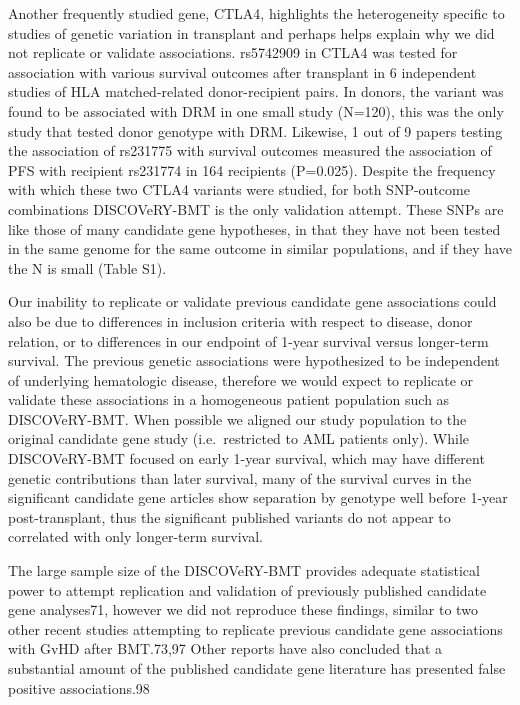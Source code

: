 \documentclass[]{DissertateUSU}
\begin{document}
Another frequently studied gene, CTLA4, highlights the heterogeneity
specific to studies of genetic variation in transplant and perhaps helps
explain why we did not replicate or validate associations. rs5742909 in
CTLA4 was tested for association with various survival outcomes after
transplant in 6 independent studies of HLA matched-related
donor-recipient pairs. In donors, the variant was found to be associated
with DRM in one small study (N=120), this was the only study that tested
donor genotype with DRM. Likewise, 1 out of 9 papers testing the
association of rs231775 with survival outcomes measured the association
of PFS with recipient rs231774 in 164 recipients (P=0.025). Despite the
frequency with which these two CTLA4 variants were studied, for both
SNP-outcome combinations DISCOVeRY-BMT is the only validation attempt.
These SNPs are like those of many candidate gene hypotheses, in that
they have not been tested in the same genome for the same outcome in
similar populations, and if they have the N is small (Table S1).

Our inability to replicate or validate previous candidate gene
associations could also be due to differences in inclusion criteria with
respect to disease, donor relation, or to differences in our endpoint of
1-year survival versus longer-term survival. The previous genetic
associations were hypothesized to be independent of underlying
hematologic disease, therefore we would expect to replicate or validate
these associations in a homogeneous patient population such as
DISCOVeRY-BMT. When possible we aligned our study population to the
original candidate gene study (i.e.~restricted to AML patients only).
While DISCOVeRY-BMT focused on early 1-year survival, which may have
different genetic contributions than later survival, many of the
survival curves in the significant candidate gene articles show
separation by genotype well before 1-year post-transplant, thus the
significant published variants do not appear to correlated with only
longer-term survival.

The large sample size of the DISCOVeRY-BMT provides adequate statistical
power to attempt replication and validation of previously published
candidate gene analyses71, however we did not reproduce these findings,
similar to two other recent studies attempting to replicate previous
candidate gene associations with GvHD after BMT.73,97 Other reports have
also concluded that a substantial amount of the published candidate gene
literature has presented false positive associations.98
\end{document}
